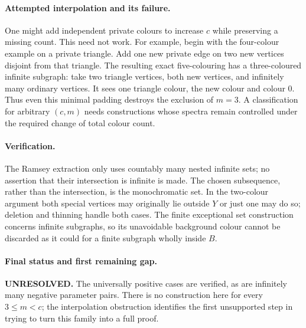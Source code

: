 \documentclass[11pt,a4paper]{article}
\begin{document}
\paragraph{Attempted interpolation and its failure.}
One might add independent private colours to increase $c$ while preserving
a missing count. This need not work. For example, begin with the
four-colour example on a private triangle. Add one new private edge on
two new vertices disjoint from that triangle. The resulting exact
five-colouring has a three-coloured infinite subgraph: take two triangle
vertices, both new vertices, and infinitely many ordinary vertices.
It sees one triangle colour, the new colour and colour $0$. Thus even
this minimal padding destroys the exclusion of $m=3$. A classification
for arbitrary $(c,m)$ needs constructions whose spectra remain controlled
under the required change of total colour count.

\paragraph{Verification.}
The Ramsey extraction only uses countably many nested infinite sets;
no assertion that their intersection is infinite is made. The chosen
subsequence, rather than the intersection, is the monochromatic set.
In the two-colour argument both special vertices may originally lie
outside $Y$ or just one may do so; deletion and thinning handle both
cases. The finite exceptional set construction concerns infinite
subgraphs, so its unavoidable background colour cannot be discarded
as it could for a finite subgraph wholly inside $B$.

\paragraph{Final status and first remaining gap.}
\textbf{UNRESOLVED.} The universally positive cases are verified, as
are infinitely many negative parameter pairs. There is no construction
here for every $3\le m<c$; the interpolation obstruction identifies
the first unsupported step in trying to turn this family into a full proof.
\end{document}
